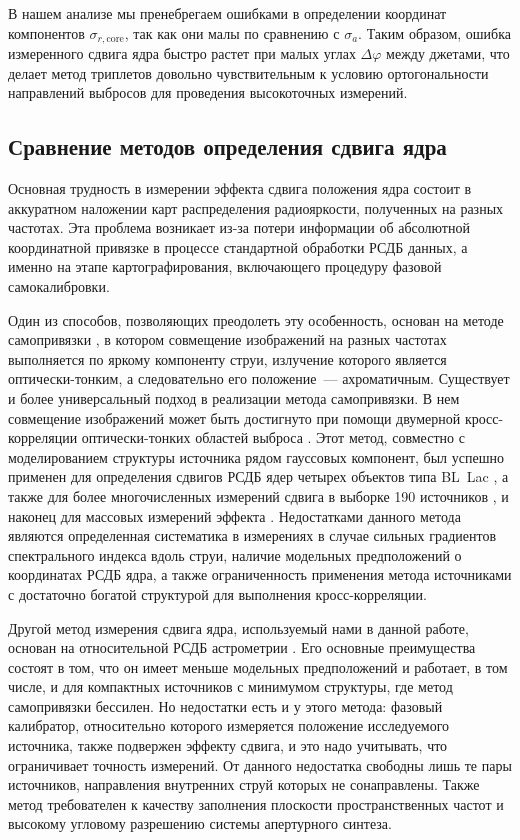 В нашем анализе мы пренебрегаем ошибками в определении координат компонентов
$\sigma_{r,\text{core}}$, так как они малы по сравнению с $\sigma_a$. Таким образом, ошибка
измеренного сдвига ядра быстро растет при малых углах $\Delta \varphi$ между джетами, что делает
метод триплетов довольно чувствительным к условию ортогональности направлений выбросов для
проведения высокоточных измерений.


\subsection{Сравнение методов определения сдвига ядра}

Основная трудность в измерении эффекта сдвига положения ядра состоит
в аккуратном наложении карт распределения радиояркости, полученных на
разных частотах. Эта проблема возникает из-за потери информации об
абсолютной координатной привязке в процессе стандартной обработки
РСДБ данных, а именно на этапе картографирования, включающего процедуру
фазовой самокалибровки.

Один из способов, позволяющих преодолеть эту особенность, основан на методе
самопривязки \cite{Lobanov_1998,Kovalev_2008,Sokolovsky_2011}, в котором
совмещение изображений на разных частотах выполняется по яркому компоненту
струи, излучение которого является оптически-тонким, а следовательно его
положение~--- ахроматичным. Существует и более универсальный подход в
реализации метода самопривязки. В нем совмещение изображений может быть
достигнуто при помощи двумерной кросс-корреляции оптически-тонких областей
выброса \cite{Walker_2000}. Этот метод, совместно с
моделированием структуры источника рядом гауссовых компонент, был успешно
применен для определения сдвигов РСДБ ядер четырех объектов типа BL~Lac
\cite{Sullivan_2009}, а также для более многочисленных измерений сдвига в
выборке 190 источников \cite{Pushkarev_2012}, и наконец для массовых
измерений эффекта \cite{Plavin2018}. Недостатками данного метода
являются определенная систематика в измерениях в случае сильных градиентов
спектрального индекса вдоль струи, наличие модельных предположений о
координатах РСДБ ядра, а также ограниченность применения метода источниками
с достаточно богатой структурой для выполнения кросс-корреляции.

Другой метод измерения сдвига ядра, используемый нами в данной работе,
основан на относительной РСДБ астрометрии \cite{MS1984}. Его основные преимущества состоят
в том, что он имеет меньше модельных предположений и работает, в том числе,
и для компактных источников с минимумом структуры, где метод самопривязки
бессилен. Но недостатки есть и у этого метода: фазовый калибратор,
относительно которого измеряется положение исследуемого источника, также
подвержен эффекту сдвига, и это надо учитывать, что ограничивает точность
измерений. От данного недостатка свободны лишь те пары источников, направления
внутренних струй которых не сонаправлены. Также метод требователен к
качеству заполнения плоскости пространственных частот и высокому угловому
разрешению системы апертурного синтеза.


